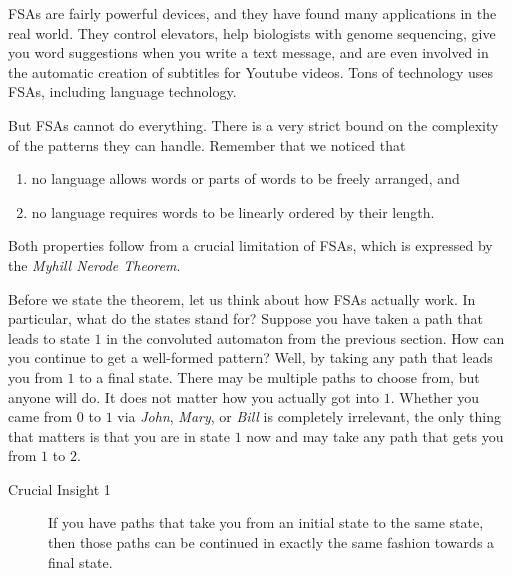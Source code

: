 FSAs are fairly powerful devices, and they have found many applications in the real world.
They control elevators, help biologists with genome sequencing, give you word suggestions when you write a text message, and are even involved in the automatic creation of subtitles for Youtube videos.
Tons of technology uses FSAs, including language technology.

But FSAs cannot do everything.
There is a very strict bound on the complexity of the patterns they can handle.
Remember that we noticed that
%
\begin{enumerate}
    \item no language allows words or parts of words to be freely arranged, and
    \item no language requires words to be linearly ordered by their length.
\end{enumerate}
%
Both properties follow from a crucial limitation of FSAs, which is expressed by the \emph{Myhill Nerode Theorem}.

Before we state the theorem, let us think about how FSAs actually work.
In particular, what do the states stand for?
Suppose you have taken a path that leads to state $1$ in the convoluted automaton from the previous section.
How can you continue to get a well-formed pattern?
Well, by taking any path that leads you from $1$ to a final state.
There may be multiple paths to choose from, but anyone will do.
It does not matter how you actually got into $1$.
Whether you came from $0$ to $1$ via \emph{John}, \emph{Mary}, or \emph{Bill} is completely irrelevant, the only thing that matters is that you are in state $1$ now and may take any path that gets you from $1$ to $2$.
%
\begin{description}
    \item[Crucial Insight 1]
        If you have paths that take you from an initial state to the same state, then those paths can be continued in exactly the same fashion towards a final state.
\end{description}

